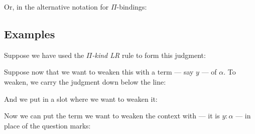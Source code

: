 \documentclass{book}
\numberwithin{equation}{chapter}
\begin{document}
\noindent
Or, in the alternative notation for $\Pi$-bindings:

\begin{prooftree}
\end{prooftree}


\subsection{Examples}


Suppose we have used the \textit{$\Pi$-kind LR} rule to form this judgment:

\begin{prooftree}
\end{prooftree}

\noindent
Suppose now that we want to weaken this with a term --- say $y$ --- of $\alpha$. To weaken, we carry the judgment down below the line:

\begin{prooftree}
\end{prooftree}

\noindent
And we put in a slot where we want to weaken it:

\begin{prooftree}
\end{prooftree}

\noindent
Now we can put the term we want to weaken the context with --- it is $y : \alpha$ --- in place of the question marks:

\begin{prooftree}
\end{prooftree}
\end{document}
